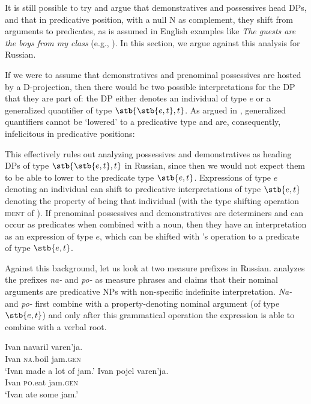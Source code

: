 \documentclass[output=paper]{langscibook}
\begin{document}


It is still possible to try and argue that demonstratives and possessives head DPs, and that in predicative position, with a null N as complement, they shift from arguments to predicates, as is assumed in English examples like \textit{The guests are the boys from my class} (e.g., \citealt{Partee1987}). In this section, we argue against this analysis for Russian.

If we were to assume that demonstratives and prenominal possessives are hosted by a D-projection, then there would be two possible interpretations for the DP that they are part of: the DP either denotes an individual of type $e$ or a generalized quantifier of type $\stb{\stb{e,t}, t}$. As argued in \citet{Landman2003}, generalized quantifiers cannot be `lowered' to a predicative type and are, consequently, infelicitous in predicative positions:


\z

\noindent This effectively rules out analyzing possessives and demonstratives as heading DPs of type $\stb{\stb{e,t}, t}$ in Russian, since then we would not expect them to be able to lower to the predicate type $\stb{e,t}$.
Expressions of type $e$ denoting an individual can shift to predicative interpretations of type $\stb{e,t}$ denoting the property of being that individual (with the type shifting operation \textsc{ident} of \citealt{Partee1987}). If prenominal possessives and demonstratives are determiners and can occur as predicates when combined with a noun, then they have an interpretation as an expression of type $e$, which can be shifted with \citeauthor{Partee1987}'s operation to a predicate of type $\stb{e,t}$. 

Against this background, let us look at two measure prefixes in Russian. \citet{Filip2005} analyzes the prefixes \textit{na-} and \textit{po-} as measure phrases and claims that their nominal arguments are predicative NPs with non-specific indefinite interpretation. \textit{Na-} and \textit{po-} first combine with a property-denoting nominal argument (of type $\stb{e,t}$) and only after this grammatical operation the expression is able to combine with a verbal root. 


\ea\label{napo-demonstratives}
    \ea\label{navaril} \gll Ivan navaril varen'ja.\\
    Ivan {\textsc{na}.boil} jam.\textsc{gen}\\
    \glt `Ivan made a lot of jam.'
    \ex\label{pojel} \gll Ivan pojel varen'ja.\\
    Ivan {\textsc{po}.eat} jam.\textsc{gen}\\
    \glt `Ivan ate some jam.'
\z\z
\end{document}
